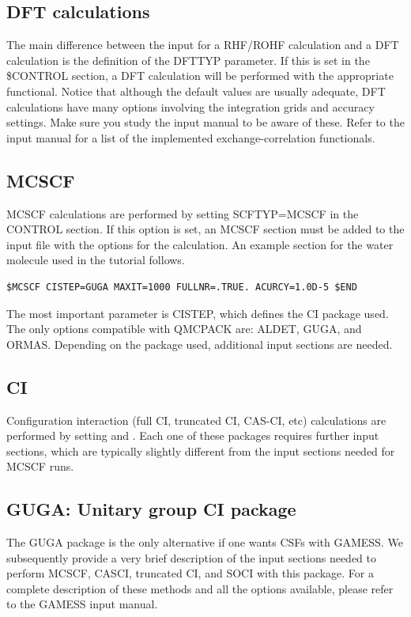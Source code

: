 {\subsection{DFT calculations}
The main difference between the input for a RHF/ROHF calculation and a DFT calculation 
is the definition of the DFTTYP parameter. If this is set in the \$CONTROL
section, a DFT calculation will be performed with the appropriate functional. Notice that
although the default values are usually adequate, DFT calculations have many options involving
the integration grids and accuracy settings. Make sure you study the input manual to be
aware of these. Refer to the input manual for a list of the implemented exchange-correlation
functionals.


\subsection{MCSCF}
MCSCF calculations are performed by setting SCFTYP=MCSCF in the CONTROL
section. If this option is set, an MCSCF section must be added to the input file with the
options for the calculation. An example section for the water molecule used in the tutorial
follows.

\begin{lstlisting}[style=GAMESS]
$MCSCF CISTEP=GUGA MAXIT=1000 FULLNR=.TRUE. ACURCY=1.0D-5 $END
\end{lstlisting}

The most important parameter is CISTEP, which defines the CI package used. The only
options compatible with QMCPACK are: ALDET, GUGA, and ORMAS. Depending on the
package used, additional input sections are needed.


\subsection{CI}
Configuration interaction (full CI, truncated CI, CAS-CI, etc) calculations are performed
by setting  and . Each one of these packages 
requires further input sections, which are typically slightly different from the input sections
needed for MCSCF runs.


\subsection{GUGA: Unitary group CI package}
The GUGA package is the only alternative if one wants CSFs with GAMESS. We subsequently provide a very brief description of the input sections needed to perform MCSCF, CASCI,
truncated CI, and SOCI with this package. For a complete description of these methods and
all the options available, please refer to the GAMESS input manual.

}
